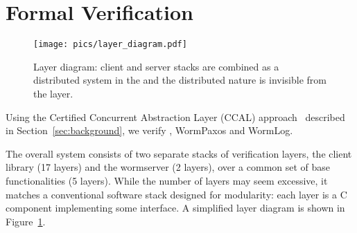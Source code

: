 
\section{Formal Verification}\label{sec:formal_verification}

\begin{figure}
\centering
\texttt{[image: pics/layer\_diagram.pdf]}
\caption{Layer diagram: client and server stacks are combined as a distributed system in the \ghostlayer{} and the distributed nature is invisible from the \WOR{} layer.
}
\label{fig:layerdiagram}
\vspace{-0.1in}
\end{figure}


Using the Certified Concurrent Abstraction Layer (CCAL) approach~\cite{deepspec, concurrency} described in Section~\ref{sec:background}, we verify \sysname{}, WormPaxos and WormLog.

The overall system consists of two separate stacks of verification layers, the client library (17 layers) and the wormserver (2 layers), over a common set of base functionalities (5 layers). While the number of layers may seem excessive, it matches a conventional software stack designed for modularity: each layer is a C component implementing some interface. A simplified layer diagram is shown in Figure~\ref{fig:layerdiagram}.

